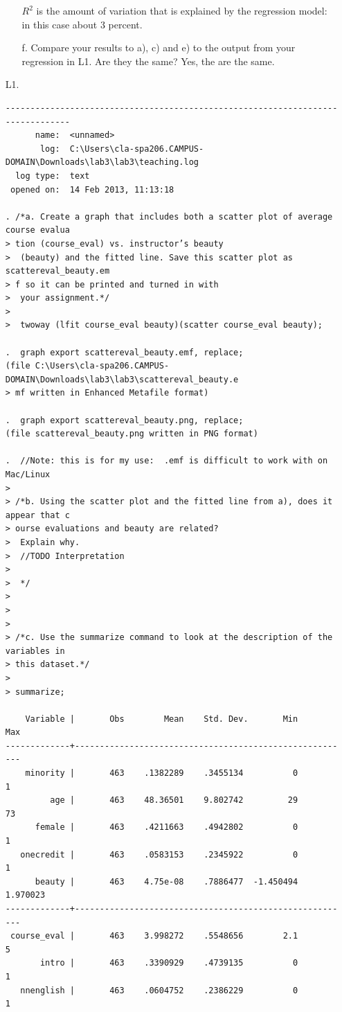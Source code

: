 \documentclass{article}
\begin{document}
\begin{enumerate}
\begin{enumerate}
$R^2$ is the amount of variation that is explained by the regression model: in this case about 3 percent.
\item[f.]Compare your results to a), c) and e) to the output from your regression in L1. Are they the same? 
\newline\newline
Yes, the are the same.
\end{enumerate}
\newpage
\item[L1.]
{\tiny
\begin{verbatim}
--------------------------------------------------------------------------------
      name:  <unnamed>
       log:  C:\Users\cla-spa206.CAMPUS-DOMAIN\Downloads\lab3\lab3\teaching.log
  log type:  text
 opened on:  14 Feb 2013, 11:13:18

. /*a. Create a graph that includes both a scatter plot of average course evalua
> tion (course_eval) vs. instructor’s beauty
>  (beauty) and the fitted line. Save this scatter plot as scattereval_beauty.em
> f so it can be printed and turned in with
>  your assignment.*/
> 
>  twoway (lfit course_eval beauty)(scatter course_eval beauty);

.  graph export scattereval_beauty.emf, replace;
(file C:\Users\cla-spa206.CAMPUS-DOMAIN\Downloads\lab3\lab3\scattereval_beauty.e
> mf written in Enhanced Metafile format)

.  graph export scattereval_beauty.png, replace;
(file scattereval_beauty.png written in PNG format)

.  //Note: this is for my use:  .emf is difficult to work with on Mac/Linux
>  
> /*b. Using the scatter plot and the fitted line from a), does it appear that c
> ourse evaluations and beauty are related?
>  Explain why.
>  //TODO Interpretation
>  
>  */
> 
> 
>  
> /*c. Use the summarize command to look at the description of the variables in 
> this dataset.*/
> 
> summarize;

    Variable |       Obs        Mean    Std. Dev.       Min        Max
-------------+--------------------------------------------------------
    minority |       463    .1382289    .3455134          0          1
         age |       463    48.36501    9.802742         29         73
      female |       463    .4211663    .4942802          0          1
   onecredit |       463    .0583153    .2345922          0          1
      beauty |       463    4.75e-08    .7886477  -1.450494   1.970023
-------------+--------------------------------------------------------
 course_eval |       463    3.998272    .5548656        2.1          5
       intro |       463    .3390929    .4739135          0          1
   nnenglish |       463    .0604752    .2386229          0          1


\end{verbatim}}
\end{enumerate}
\end{document}
